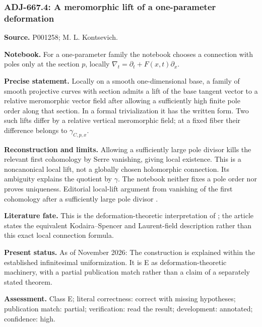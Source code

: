 \subsubsection{ADJ-667.4: A meromorphic lift of a one-parameter deformation}
\noindent\textbf{Source.} P001258; M. L. Kontsevich.\par
\noindent\textbf{Notebook.} For a one-parameter family the notebook chooses a connection with poles only at the section \(p\), locally \(\nabla_t=\partial_t+F(x,t)\partial_x\).\par

\noindent\textbf{Precise statement.} Locally on a smooth one-dimensional base, a family of smooth projective curves with section admits a lift of the base tangent vector to a relative meromorphic vector field after allowing a sufficiently high finite pole order along that section. In a formal trivialization it has the written form. Two such lifts differ by a relative vertical meromorphic field; at a fixed fiber their difference belongs to \(\gamma_{C,p,x}\).\par

\noindent\textbf{Reconstruction and limits.} Allowing a sufficiently large pole divisor kills the relevant first cohomology by Serre vanishing, giving local existence. This is a noncanonical local lift, not a globally chosen holomorphic connection. Its ambiguity explains the quotient by \(\gamma\). The notebook neither fixes a pole order nor proves uniqueness. Editorial local-lift argument from vanishing of the first cohomology after a sufficiently large pole divisor \ours.\par

\noindent\textbf{Literature fate.} This is the deformation-theoretic interpretation of \citet[\S1]{kontsevich1987virasoro}; the article states the equivalent Kodaira--Spencer and Laurent-field description rather than this exact local connection formula.\par

\noindent\textbf{Present status.} As of November 2026: The construction is explained within the established infinitesimal uniformization. It is E as deformation-theoretic machinery, with a partial publication match rather than a claim of a separately stated theorem.\par

\noindent\textbf{Assessment.} Class E; literal correctness: correct with missing hypotheses; publication match: partial; verification: read the result; development: annotated; confidence: high.\par

